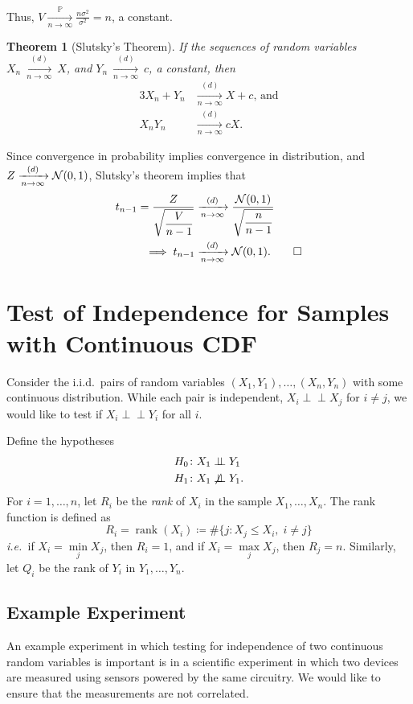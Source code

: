 \documentclass[letterpaper, oneside, reqno]{amsart}
\newtheorem{theorem}{Theorem}[section]
\numberwithin{equation}{section}
\newcommand{\ie}{\emph{i.e.\ }}
\newcommand{\ddfrac}[2]{\frac{\displaystyle #1}{\displaystyle #2}}
\newcommand{\N}[2]{\mathcal{N}\mleft( #1, #2 \mright)}
\newcommand{\indep}{\perp \!\!\! \perp}  %
\newcommand{\nindep}{\centernot\indep}
\newcommand{\iid}{i.i.d.}
\newcommand{\Plim}{\xrightarrow[n \to \infty]{\mathbb{P}}}
\newcommand{\Dlim}{\xrightarrow[n \to \infty]{(d)}}
\begin{document}
Thus, $V \Plim \frac{n \sigma^2}{\sigma^2} = n$, a constant. 

\begin{theorem}[Slutsky's Theorem]
  If the sequences of random variables $X_n~\Dlim~X$, and $Y_n~\Dlim~c$,
  a constant, then
  \begin{alignat*}{3}
    X_n + Y_n &\Dlim X + c \text{, and} \\
    X_n Y_n &\Dlim cX.
  \end{alignat*}
\end{theorem}

Since convergence in probability implies convergence in distribution, and $Z
\Dlim \N{0}{1}$, Slutsky's theorem implies that
\begin{align*}
  t_{n-1} = \ddfrac{Z}{\sqrt{\frac{V}{n-1}}} 
        &\Dlim \ddfrac{\N{0}{1}}{\sqrt{\frac{n}{n-1}}} \\
        \implies t_{n-1} &\Dlim \N{0}{1}.  \qed
\end{align*}

\clearpage
\section{Test of Independence for Samples with Continuous CDF}
Consider the \iid\ pairs of random variables $(X_1, Y_1), \dots, (X_n, Y_n)$
with some continuous distribution. While each pair is independent, $X_i \indep
X_j$ for $i \ne j$, we would like to test if $X_i \indep Y_i$ for all $i$.

Define the hypotheses
\begin{align*}
  H_0 &\colon X_1 \indep Y_1 \\
  H_1 &\colon X_1 \nindep Y_1.
\end{align*}
For $i = 1, \dots, n$, let $R_i$ be the \emph{rank} of $X_i$ in the sample $X_1,
\dots, X_n$. The rank function is defined as
\begin{equation} \label{eq:R_i}
  R_i = \operatorname{rank}(X_i) \coloneqq \#\{j \colon X_j \le X_i, \; i \ne j\} 
\end{equation}
\ie if $X_i = \min\limits_j X_j$, then $R_i = 1$, and if $X_i = \max\limits_j
X_j$, then $R_j = n$. 
Similarly, let $Q_i$ be the rank of $Y_i$ in $Y_1, \dots, Y_n$.

\subsection{Example Experiment}
An example experiment in which testing for independence of two continuous random
variables is important is in a scientific experiment in which two devices are
measured using sensors powered by the same circuitry. We would like to ensure
that the measurements are not correlated.
\end{document}
